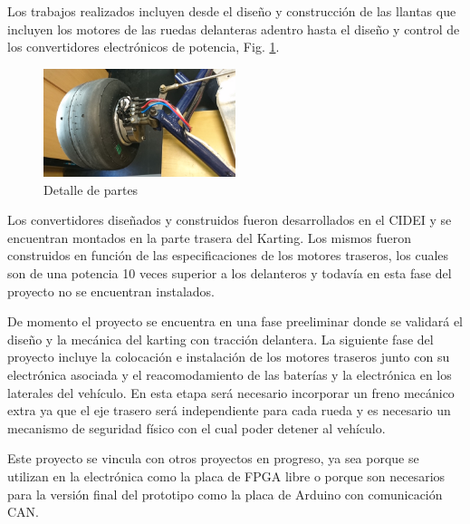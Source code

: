 \documentclass[a4]{article}
\begin{document}
Los trabajos realizados incluyen desde el diseño y construcción de las llantas que incluyen los motores de las ruedas delanteras adentro hasta el diseño y control de los convertidores electrónicos de potencia, Fig. \ref{fig:kart2}.
\begin{figure}[h]
    \centering
    \includegraphics[width=0.5\textwidth]{figs/kart2.jpg}
    \caption{Detalle de partes}
    \label{fig:kart2}
\end{figure}
Los convertidores diseñados y construidos fueron desarrollados en el CIDEI y se encuentran montados en la parte trasera del Karting. Los mismos fueron construidos en función de las especificaciones de los motores traseros, los cuales son de una potencia 10 veces superior a los delanteros y todavía en esta fase del proyecto no se encuentran instalados.

De momento el proyecto se encuentra en una fase preeliminar donde se validará el diseño y la mecánica del karting con tracción delantera. La siguiente fase del proyecto incluye la colocación e instalación de los motores traseros junto con su electrónica asociada y el reacomodamiento de las baterías y la electrónica en los laterales del vehículo. En esta etapa será necesario incorporar un freno mecánico extra ya que el eje trasero será independiente para cada rueda y es necesario un mecanismo de seguridad físico con el cual poder detener al vehículo.

Este proyecto se vincula con otros proyectos en progreso, ya sea porque se utilizan en la electrónica como la placa de FPGA libre o porque son necesarios para la versión final del prototipo como la placa de Arduino con comunicación CAN.
\end{document}
